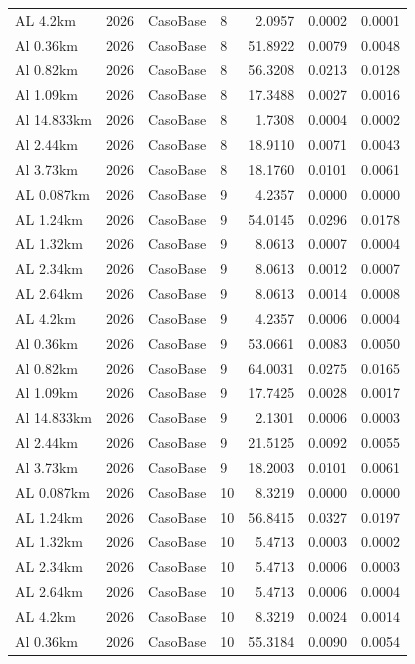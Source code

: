 \documentclass[11pt,a4paper]{article}
\begin{document}
\begin{longtable}{llllrrr}
AL 4.2km & 2026 & CasoBase & 8 & 2.0957 & 0.0002 & 0.0001 \\
Al 0.36km & 2026 & CasoBase & 8 & 51.8922 & 0.0079 & 0.0048 \\
Al 0.82km & 2026 & CasoBase & 8 & 56.3208 & 0.0213 & 0.0128 \\
Al 1.09km & 2026 & CasoBase & 8 & 17.3488 & 0.0027 & 0.0016 \\
Al 14.833km & 2026 & CasoBase & 8 & 1.7308 & 0.0004 & 0.0002 \\
Al 2.44km & 2026 & CasoBase & 8 & 18.9110 & 0.0071 & 0.0043 \\
Al 3.73km & 2026 & CasoBase & 8 & 18.1760 & 0.0101 & 0.0061 \\
AL 0.087km & 2026 & CasoBase & 9 & 4.2357 & 0.0000 & 0.0000 \\
AL 1.24km & 2026 & CasoBase & 9 & 54.0145 & 0.0296 & 0.0178 \\
AL 1.32km & 2026 & CasoBase & 9 & 8.0613 & 0.0007 & 0.0004 \\
AL 2.34km & 2026 & CasoBase & 9 & 8.0613 & 0.0012 & 0.0007 \\
AL 2.64km & 2026 & CasoBase & 9 & 8.0613 & 0.0014 & 0.0008 \\
AL 4.2km & 2026 & CasoBase & 9 & 4.2357 & 0.0006 & 0.0004 \\
Al 0.36km & 2026 & CasoBase & 9 & 53.0661 & 0.0083 & 0.0050 \\
Al 0.82km & 2026 & CasoBase & 9 & 64.0031 & 0.0275 & 0.0165 \\
Al 1.09km & 2026 & CasoBase & 9 & 17.7425 & 0.0028 & 0.0017 \\
Al 14.833km & 2026 & CasoBase & 9 & 2.1301 & 0.0006 & 0.0003 \\
Al 2.44km & 2026 & CasoBase & 9 & 21.5125 & 0.0092 & 0.0055 \\
Al 3.73km & 2026 & CasoBase & 9 & 18.2003 & 0.0101 & 0.0061 \\
AL 0.087km & 2026 & CasoBase & 10 & 8.3219 & 0.0000 & 0.0000 \\
AL 1.24km & 2026 & CasoBase & 10 & 56.8415 & 0.0327 & 0.0197 \\
AL 1.32km & 2026 & CasoBase & 10 & 5.4713 & 0.0003 & 0.0002 \\
AL 2.34km & 2026 & CasoBase & 10 & 5.4713 & 0.0006 & 0.0003 \\
AL 2.64km & 2026 & CasoBase & 10 & 5.4713 & 0.0006 & 0.0004 \\
AL 4.2km & 2026 & CasoBase & 10 & 8.3219 & 0.0024 & 0.0014 \\
Al 0.36km & 2026 & CasoBase & 10 & 55.3184 & 0.0090 & 0.0054 \\

\end{longtable}
\end{document}
